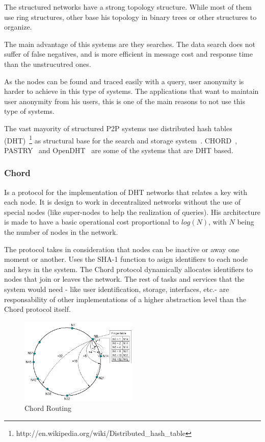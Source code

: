The structured networks have a strong topology structure. While most of them
use ring structures, other base his topology in binary trees or other
structures to organize.

The main advantage of this systems are they searches. The data search does not
suffer of false negatives, and is more efficient in message cost and response
time than the unstrucutred ones. 

As the nodes can be found and traced easily with a query, user anonymity is harder to
achieve in this type of systems.  The applications that want to maintain user
anonymity from his users, this is one of the main reasons to not use this type
of systems.

The vast mayority of structured P2P systems use distributed hash tables
(DHT)~\footnote{http://en.wikipedia.org/wiki/Distributed\_hash\_table} as
structural base for the search and storage system~\cite{BalakrishnanEtAl03}.
CHORD~\cite{conf:hotos:DabekBKKMSB01},
PASTRY~\cite{oai:CiteSeerPSU:441779} and 
OpenDHT~\cite{Rhea:2005:OPD:1080091.1080102}
are some of the systems that are DHT based.

\subsubsection{Chord}
\label{sec:chord}

Is a protocol for the implementation of DHT networks that relates a key with
each node. It is design to work in decentralized networks without the use of
special nodes (like super-nodes to help the realization of queries). His
architecture is made to have a basic operational cost proportional to $log(N)$,
with $N$ being the number of nodes in the network.

The protocol takes in consideration that nodes can be inactive or away one
moment or another. Uses the SHA-1 function to asign identifiers to each node
and keys in the system. The Chord protocol dynamically allocates identifiers to nodes that
join or leaves the network. The rest of tasks and services that the system
would need - like user identification, storage, interfaces, etc.- are
responsability of other implementations of a higher abstraction level than the
Chord protocol itself.

\label{sec:chord}
\begin{figure}
\center
\includegraphics[width=0.5\textwidth]{img/chord-search}
\caption{Chord Routing}
\label{fig:p2p_estructured_chord_search}
\end{figure}

